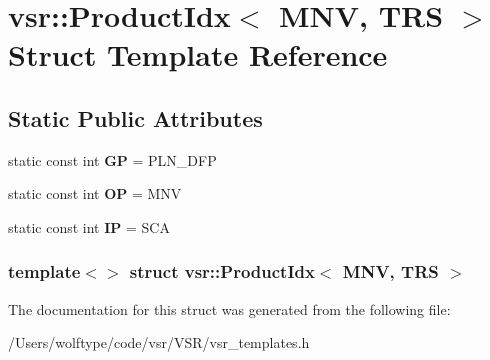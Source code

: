 \hypertarget{structvsr_1_1_product_idx_3_01_m_n_v_00_01_t_r_s_01_4}{\section{vsr\-:\-:Product\-Idx$<$ M\-N\-V, T\-R\-S $>$ Struct Template Reference}
\label{structvsr_1_1_product_idx_3_01_m_n_v_00_01_t_r_s_01_4}
}
\subsection*{Static Public Attributes}
\begin{DoxyCompactItemize}
\item 
\hypertarget{structvsr_1_1_product_idx_3_01_m_n_v_00_01_t_r_s_01_4_ab50d6bc43ae28eb7d9b936aaf6883d29}{static const int {\bfseries G\-P} = P\-L\-N\-\_\-\-D\-F\-P}\label{structvsr_1_1_product_idx_3_01_m_n_v_00_01_t_r_s_01_4_ab50d6bc43ae28eb7d9b936aaf6883d29}

\item 
\hypertarget{structvsr_1_1_product_idx_3_01_m_n_v_00_01_t_r_s_01_4_a4c5daa41b9136150599372e51927a9d2}{static const int {\bfseries O\-P} = M\-N\-V}\label{structvsr_1_1_product_idx_3_01_m_n_v_00_01_t_r_s_01_4_a4c5daa41b9136150599372e51927a9d2}

\item 
\hypertarget{structvsr_1_1_product_idx_3_01_m_n_v_00_01_t_r_s_01_4_ac668da5ab51bac1105dc593f7da54f00}{static const int {\bfseries I\-P} = S\-C\-A}\label{structvsr_1_1_product_idx_3_01_m_n_v_00_01_t_r_s_01_4_ac668da5ab51bac1105dc593f7da54f00}

\end{DoxyCompactItemize}
\subsubsection*{template$<$$>$ struct vsr\-::\-Product\-Idx$<$ M\-N\-V, T\-R\-S $>$}



The documentation for this struct was generated from the following file\-:\begin{DoxyCompactItemize}
\item 
/\-Users/wolftype/code/vsr/\-V\-S\-R/vsr\-\_\-templates.\-h\end{DoxyCompactItemize}
